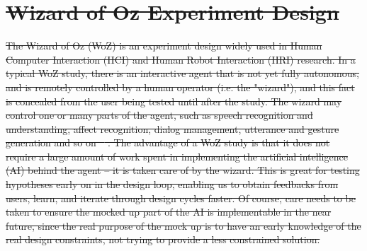 \documentclass{ut-thesis}
\providecommand{\DIFdeltex}[1]{{\protect\color{red}\sout{#1}}}                      %
\providecommand{\DIFdelbegin}{} %
\providecommand{\DIFdel}[1]{\texorpdfstring{\DIFdeltex{#1}}{}} %
\begin{document}

\DIFdelbegin \section{\DIFdel{Wizard of Oz Experiment Design}}
\addtocounter{section}{-1}%

\DIFdel{The Wizard of Oz (WoZ) is an experiment design widely used in Human Computer Interaction (HCI) and Human Robot Interaction (HRI) research.  In a typical WoZ study, there is an interactive agent that is not yet fully autonomous, and is remotely controlled by a human operator (i.e. the "wizard"), and this fact is concealed from the user being tested until after the study.  The wizard may control one or many parts of the agent, such as speech recognition and understanding, affect recognition, dialog management, utterance and gesture generation and so on \mbox{%
\cite{bhargava2013demonstration}}%
.  The advantage of a WoZ study is that it does not require a large amount of work spent in implementing the artificial intelligence (AI) behind the agent -- it is taken care of by the wizard.  This is great for testing hypotheses early on in the design loop, enabling us to obtain feedbacks from users, learn, and iterate through design cycles faster.  Of course, care needs to be taken to ensure the mocked up part of the AI is implementable in the near future, since the real purpose of the mock up is to have an early knowledge of the real design constraints, not trying to provide a less constrained solution.
}%
\end{document}
